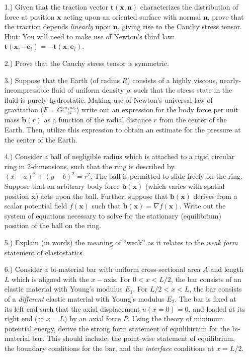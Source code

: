 \documentclass[12pt]{article}
\begin{document}
\maketitle

\begin{itemize}
	\item[1.)] Given that the traction vector $\mathbf{t} ( \mathbf{x}, \mathbf{n} )$ characterizes the distribution of force at position $\mathbf{x}$ acting upon an oriented surface with normal $\mathbf{n}$, prove that the traction depends \textit{linearly} upon $\mathbf{n}$, giving rise to the Cauchy stress tensor. \underline{Hint}: You will need to make use of Newton's third law: $\mathbf{t} (\mathbf{x}, - \mathbf{e}_i) = - \mathbf{t} (\mathbf{x}, \mathbf{e}_i)$.
	\item[2.)] Prove that the Cauchy stress tensor is symmetric.
	\item[3.)] Suppose that the Earth (of radius $R$) consists of a highly viscous, nearly-incompressible fluid of uniform density $\rho$, such that the stress state in the fluid is purely hydrostatic. Making use of Newton's universal law of gravitation ($F = G \frac{m_1 m_2}{r^2}$) write out an expression for the body force per unit mass $\mathbf{b}(r)$ as a function of the radial distance $r$ from the center of the Earth. Then, utilize this expression to obtain an estimate for the pressure at the center of the Earth.
	\item[4.)] Consider a ball of negligible radius which is attached to a rigid circular ring in 2-dimensions, such that the ring is described by $(x-a)^2 + (y-b)^2 = r^2$. The ball is permitted to slide freely on the ring. Suppose that an arbitrary body force $\mathbf{b} ( \mathbf{x} )$ (which varies with spatial position $\mathbf{x}$) acts upon the ball. Further, suppose that $\mathbf{b} (\mathbf{x})$ derives from a scalar potential field $f (\mathbf{x})$ such that $\mathbf{b} (\mathbf{x}) = \nabla f (\mathbf{x})$. Write out the system of equations necessary to solve for the stationary (equilibrium) position of the ball on the ring.
	\item[5.)] Explain (in words) the meaning of ``weak'' as it relates to the \textit{weak form} statement of elastostatics.
	\item[6.)] Consider a bi-material bar with uniform cross-sectional area $A$ and length $L$ which is aligned with the $x-$axis. For $0 < x < L/2$, the bar consists of an elastic material with Young's modulus $E_1$. For $L/2 < x < L$, the bar consists of a \textit{different} elastic material with Young's modulus $E_2$. The bar is fixed at its left end such that the axial displacement $u( x = 0 ) = 0$, and loaded at its right end (at $x = L$) by an axial force $P$. Using the theory of minimum potential energy, derive the strong form statement of equilibirium for the bi-material bar. This should include: the point-wise statement of equilibrium, the boundary conditions for the bar, and the \textit{interface} conditions at $x = L/2$.

\end{itemize}
\end{document}
